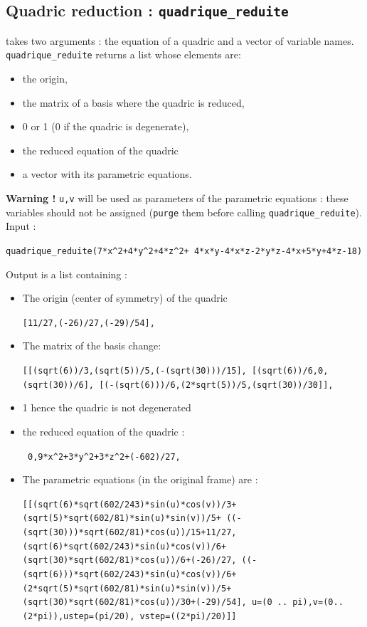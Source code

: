 \documentclass[a4paper,11pt]{book}
\begin{document}
\subsection{Quadric reduction : {\tt quadrique\_reduite}}
 takes two arguments : the equation of a 
quadric and a vector of variable names.\\ 
{\tt quadrique\_reduite} returns a list whose elements are:
\begin{itemize}
\item the origin, 
\item the matrix of a basis where the quadric is reduced, 
\item 0 or 1 (0 if the quadric is degenerate), 
\item the reduced equation of the quadric 
\item a vector with its parametric equations.
\end{itemize}  
{\bf Warning !} 
{\tt u,v} will be used as parameters of the parametric equations : 
these variables should not be assigned ({\tt purge} them before
calling {\tt quadrique\_reduite}).\\
Input :
\begin{center}{\tt quadrique\_reduite(7*x\verb|^|2+4*y\verb|^|2+4*z\verb|^|2+ 4*x*y-4*x*z-2*y*z-4*x+5*y+4*z-18)}\end{center}
Output is a list containing :
\begin{itemize}
\item The origin (center of symmetry) of the quadric
\begin{center}{\tt [11/27,(-26)/27,(-29)/54],}\end{center}
\item The matrix of the basis change:
\begin{center}{\tt  [[(sqrt(6))/3,(sqrt(5))/5,(-(sqrt(30)))/15],
    [(sqrt(6))/6,0,(sqrt(30))/6],
    [(-(sqrt(6)))/6,(2*sqrt(5))/5,(sqrt(30))/30]],}\end{center}
\item 1 hence the quadric is not degenerated
\item the reduced equation of the quadric :
\begin{center}{\tt
    0,9*x\verb|^|2+3*y\verb|^|2+3*z\verb|^|2+(-602)/27,}\end{center} 
\item
The parametric equations (in the original frame) are :
\begin{center}{\tt [[(sqrt(6)*sqrt(602/243)*sin(u)*cos(v))/3+
    (sqrt(5)*sqrt(602/81)*sin(u)*sin(v))/5+
    ((-(sqrt(30)))*sqrt(602/81)*cos(u))/15+11/27,
    (sqrt(6)*sqrt(602/243)*sin(u)*cos(v))/6+
    (sqrt(30)*sqrt(602/81)*cos(u))/6+(-26)/27,
    ((-(sqrt(6)))*sqrt(602/243)*sin(u)*cos(v))/6+
    (2*sqrt(5)*sqrt(602/81)*sin(u)*sin(v))/5+
    (sqrt(30)*sqrt(602/81)*cos(u))/30+(-29)/54], 
     u=(0 .. pi),v=(0.. (2*pi)),ustep=(pi/20),
     vstep=((2*pi)/20)]]}\end{center}
\end{itemize}
\end{document}
